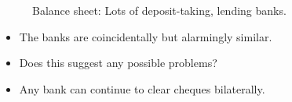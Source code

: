 \documentclass[20pt]{article}
\begin{document}
\begin{center}
\begin{figure}[H]
\begin{center}
\begin{tikzpicture}[auto, node distance=3cm,scale=(2/10),>=latex']




\end{tikzpicture}
\end{center}
\caption{Balance sheet: Lots of deposit-taking, lending banks.}
\end{figure}
\end{center}

\begin{itemize}
    \item The banks are coincidentally but alarmingly similar.
    \item Does this suggest any possible problems?
    \item Any bank can continue to clear cheques bilaterally. 
\end{itemize}
\end{document}
